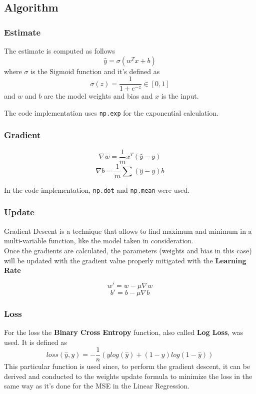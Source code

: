 \documentclass[
	letterpaper, %
	10pt, %
]{class}
\begin{document}
\subsection{Algorithm}

\subsubsection{Estimate}
The estimate is computed as follows
$$ \hat{y} = \sigma(w^Tx + b) $$
where $\sigma$ is the Sigmoid function \cite{sigmoid} and it's defined as
$$ \sigma(z) = \frac{1}{1 + e^{-z}} \in [0,1] $$
and $w$ and $b$ are the model weights and bias and $x$ is the input.

The code implementation uses \texttt{np.exp} for the exponential calculation.

\subsubsection{Gradient}

$$ \nabla w = \frac{1}{m}x^T(\hat{y} - y) $$
$$ \nabla b = \frac{1}{m}\sum(\hat{y} - y) b $$

In the code implementation, \texttt{np.dot} and \texttt{np.mean} were used.

\subsubsection{Update}

Gradient Descent \cite{sgd} is a technique that allows to find maximum and minimum in a multi-variable function, like the model taken in consideration.\\
Once the gradients are calculated, the parameters (weights and bias in this case) will be updated with the gradient value properly mitigated with the \textbf{Learning Rate}

$$ w' = w - \mu \nabla w $$
$$ b' = b - \mu \nabla b $$

\subsubsection{Loss}
For the loss the \textbf{Binary Cross Entropy} \cite{binarycrossentropy} function, also called \textbf{Log Loss}, was used.
It is defined as
$$ loss(\hat{y}, y) = -\frac{1}{n}(y log(\hat{y}) + (1-y)log(1-\hat{y})) $$
This particular function is used since, to perform the gradient descent, it can be derived and conducted to the weights update formula to minimize the loss in the same way as it's done for the MSE \cite{mse} in the Linear Regression.\\
\end{document}
